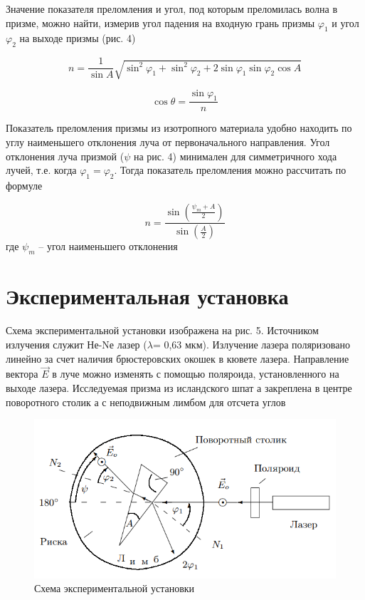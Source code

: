 \documentclass[a4paper,12pt]{article}
\begin{document}
Значение показателя преломления и угол, под которым преломилась волна в призме, можно найти, измерив угол падения на входную грань призмы $\varphi_1$ и угол $\varphi_2$ на выходе призмы (рис. 4)

\begin{equation}
n=\frac{1}{\sin A} \sqrt{\sin ^{2} \varphi_{1}+\sin ^{2} \varphi_{2}+2 \sin \varphi_{1} \sin \varphi_{2} \cos A}
\end{equation}

\[
\cos \theta = \frac{\sin \varphi_1}{n}
\]

\newpage

Показатель преломления призмы из изотропного материала
удобно находить по углу наименьшего отклонения луча от первоначального направления. Угол отклонения луча призмой ($\psi$ на рис. 4) минимален для симметричного хода лучей, т.е. когда $\varphi_1 = \varphi_2$. Тогда показатель преломления можно рассчитать по формуле

\begin{equation}
n=\frac{\sin \left(\frac{\psi_{m}+A}{2}\right)}{\sin \left(\frac{A}{2}\right)}
\end{equation}
где $\psi_m$ -- угол наименьшего отклонения

\section*{Экспериментальная установка}

Схема экспериментальной установки изображена на рис. 5. Источником излучения служит Не-Nе лазер ($\lambda$= 0,63 мкм). Излучение лазера поляризовано линейно за счет наличия брюстеровских окошек в кювете лазера. Направление вектора $\vec{E}$ в луче можно изменять с помощью поляроида, установленного на выходе лазера. Исследуемая призма из исландского шпат а закреплена в центре поворотного столик а с неподвижным лимбом для отсчета углов

\begin{figure}[h]
	\begin{center}
	\includegraphics[scale=1]{fig5}
	\caption{Схема экспериментальной установки}
	\end{center}
\end{figure}
\end{document}
